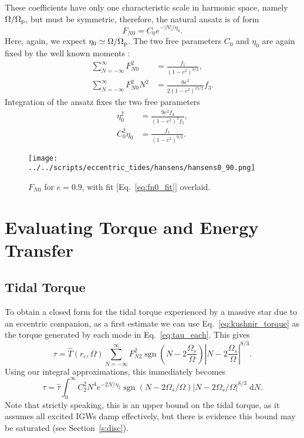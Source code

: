 \documentclass[
        fleqn,
        usenatbib,
        referee,
    ]{mnras}
\newcommand*{\abs}[1]{\left|#1\right|}
\newcommand*{\p}[1]{\left(#1\right)}
\DeclareMathOperator*{\sgn}{sgn}
\begin{document}
These coefficients have only one characteristic scale in harmonic space, namely
$\Omega / \Omega_{\rm p}$, but must be symmetric, therefore, the natural
ansatz is of form
\begin{equation}
    F_{N0} = C_0 e^{-\abs{N} / \eta_0}.\label{eq:fn0_fit}
\end{equation}
Here, again, we expect $\eta_0 \simeq \Omega / \Omega_{\rm p}$. The two free
parameters $C_0$ and $\eta_0$ are again fixed by the well known moments
\citep{hut,sl,vlf}:
\begin{align}
    \sum\limits_{N = -\infty}^\infty F_{N0}^2 &= \frac{f_5}{\p{1 - e^2}^{9/2}}
        ,\\
    \sum\limits_{N = -\infty}^\infty F_{N0}^2 N^2
        &= \frac{9e^2}{2\p{1 - e^2}^{15/2}}
            f_3.
\end{align}
Integration of the ansatz fixes the two free parameters
\begin{align}
    \eta_0^2 &= \frac{9e^2f_3}{\p{1 - e^2}^{3}f_5},\\
    C_0^2\eta_0 &= \frac{f_5}{\p{1 - e^2}^{9/2}}.
\end{align}

\begin{figure}
    \centering
    \texttt{[image: ../../scripts/eccentric\_tides/hansens/hansens0\_90.png]}
    \caption{$F_{N0}$ for $e = 0.9$, with fit [Eq.~\eqref{eq:fn0_fit}]
    overlaid.}\label{fig:fn0_fit}
\end{figure}

\section{Evaluating Torque and Energy Transfer}\label{s:eval}

\subsection{Tidal Torque}

To obtain a closed form for the tidal torque experienced by a massive star due
to an eccentric companion, as a first estimate we can use
Eq.~\eqref{eq:kushnir_torque} as the torque generated by each mode in
Eq.~\eqref{eq:tau_each}. This gives
\begin{equation}
    \tau = \hat{T}(r_c, \Omega) \sum\limits_{N = -\infty}^\infty
        F_{N2}^2 \sgn\p{N - 2\frac{\Omega_s}{\Omega}}
            \abs{N - 2\frac{\Omega_s}{\Omega}}^{8/3}.\label{eq:tau_sum}
\end{equation}
Using our integral approximations, this immediately becomes
\begin{equation}
    \tau = \hat{\tau} \int_0^\infty C_2^2 N^4 e^{-2N / \eta_2}
        \sgn\left(N - 2\Omega_s / \Omega\right) \left|N - 2 \Omega_s /
            \Omega\right|^{8/3}\;\mathrm{d}N.\label{eq:tau_int}
\end{equation}
Note that strictly speaking, this is an upper bound on the tidal torque, as it
assumes all excited IGWs damp effectively, but there is evidence this bound may
be saturated (see Section~\ref{s:disc}).
\end{document}
